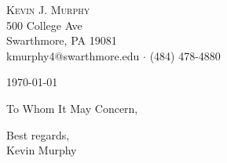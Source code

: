 \documentclass[paper=a4, fontsize=11pt]{scrartcl} %
\begin{document}
\textsc{Kevin J. Murphy}\\
500 College Ave\\
Swarthmore, PA 19081\\
kmurphy4@swarthmore.edu $\cdot$ (484) 478-4880

\today

To Whom It May Concern,






Best regards,\\
Kevin Murphy
\end{document}
